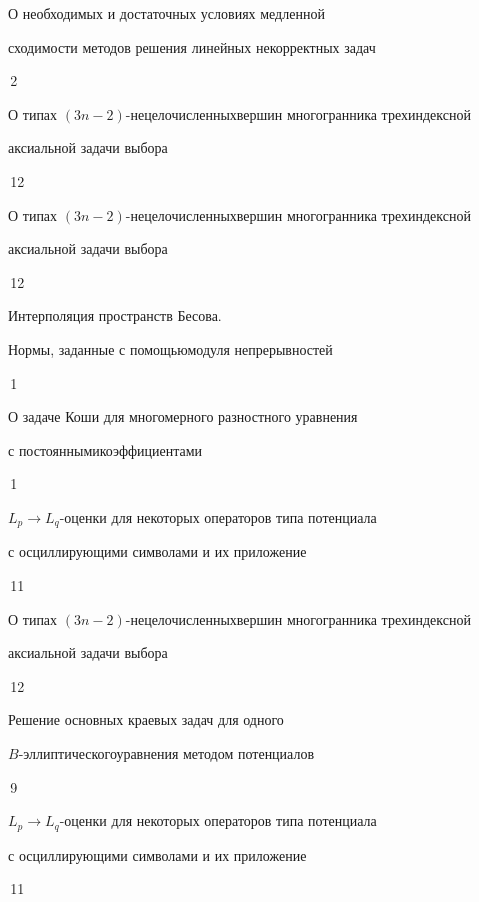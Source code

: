 

{О необходимых и достаточных условиях медленной\newline


сходимости методов решения линейных некорректных задач}{\No\,2}




{О типах $(3n-2)$-нецелочисленных\newline вершин многогранника трехиндексной


аксиальной задачи выбора}{\No\,12}




{О типах $(3n-2)$-нецелочисленных\newline вершин многогранника трехиндексной


аксиальной задачи выбора}{\No\,12}




{Интерполяция пространств Бесова.


Нормы, заданные с помощью\newline модуля непрерывностей}{\No\,1}




{О задаче Коши для многомерного разностного уравнения


с постоянными\newline коэффициентами}{\No\,1}




{$L_p\to L_q$-оценки для некоторых операторов типа потенциала\newline


с осциллирующими символами и их приложение}{\No\,11}




{О типах $(3n-2)$-нецелочисленных\newline вершин многогранника трехиндексной


аксиальной задачи выбора}{\No\,12}




{Решение основных краевых задач для одного


$B$-эллиптического\newline уравнения методом потенциалов}{\No\,9}




{$L_p\to L_q$-оценки для некоторых операторов типа потенциала\newline


с осциллирующими символами и их приложение}{\No\,11}


